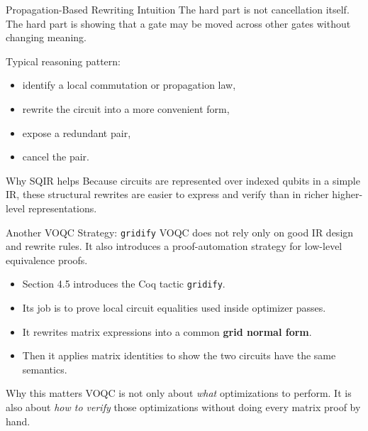 \documentclass[aspectratio=169]{beamer}
\begin{document}
\begin{frame}{Propagation-Based Rewriting Intuition}
\justifying
The hard part is not cancellation itself.  
The hard part is showing that a gate may be moved across other gates without changing meaning.

\vspace{0.8em}
Typical reasoning pattern:
\begin{itemize}
    \item identify a local commutation or propagation law,
    \item rewrite the circuit into a more convenient form,
    \item expose a redundant pair,
    \item cancel the pair.
\end{itemize}

\vspace{0.8em}
\begin{alertblock}{Why SQIR helps}
Because circuits are represented over indexed qubits in a simple IR, these structural rewrites are easier to express and verify than in richer higher-level representations.
\end{alertblock}
\end{frame}
\begin{frame}{Another VOQC Strategy: \texttt{gridify}}
\justifying
VOQC does not rely only on good IR design and rewrite rules.  
It also introduces a proof-automation strategy for low-level equivalence proofs.

\vspace{0.7em}
\begin{itemize}
    \item Section 4.5 introduces the Coq tactic \texttt{gridify}.
    \item Its job is to prove local circuit equalities used inside optimizer passes.
    \item It rewrites matrix expressions into a common \textbf{grid normal form}.
    \item Then it applies matrix identities to show the two circuits have the same semantics.
\end{itemize}

\vspace{0.7em}
\begin{block}{Why this matters}
VOQC is not only about \emph{what} optimizations to perform.  
It is also about \emph{how to verify} those optimizations without doing every matrix proof by hand.
\end{block}
\end{frame}
\end{document}
